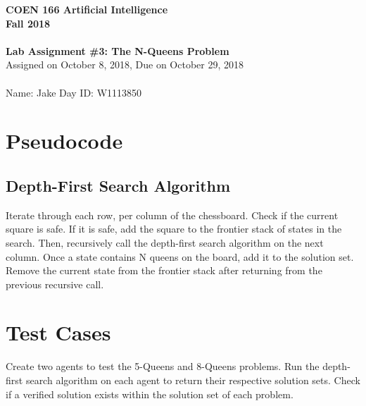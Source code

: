 \documentclass[12pt, letterpaper]{article}
\begin{document}
{\center
	{\bfseries COEN 166 Artificial Intelligence} \\
	{\bfseries Fall 2018} \\~\\
	{\bfseries Lab Assignment \#3: The N-Queens Problem} \\
	{Assigned on October 8, 2018, Due on October 29, 2018} \\~\\
	{Name: Jake Day \qquad ID: W1113850} \\
}

\section*{\bfseries Pseudocode}
	\subsection*{Depth-First Search Algorithm}
		Iterate through each row, per column of the chessboard.
		Check if the current square is safe.
		If it is safe, add the square to the frontier stack of states in the search.
		Then, recursively call the depth-first search algorithm on the next column.
		Once a state contains N queens on the board, add it to the solution set.
		Remove the current state from the frontier stack after returning from the previous recursive call.
	
\section*{\bfseries Test Cases}
	Create two agents to test the 5-Queens and 8-Queens problems.
	Run the depth-first search algorithm on each agent to return their respective solution sets.
	Check if a verified solution exists within the solution set of each problem.
\end{document}
